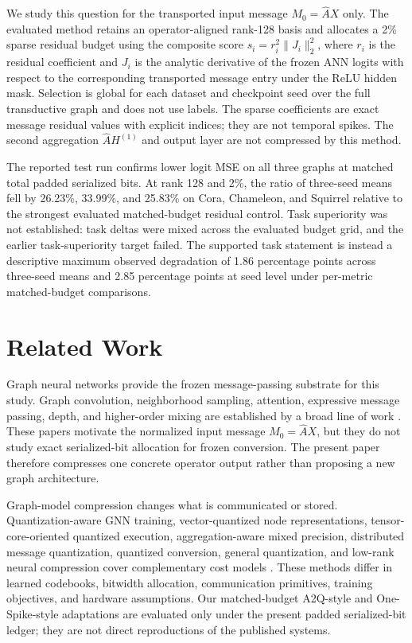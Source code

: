\documentclass{article}
\begin{document}
We study this question for the transported input message \(M_0=\hat{A}X\) only. The evaluated method retains an operator-aligned rank-128 basis and allocates a 2\% sparse residual budget using the composite score \(s_i=r_i^2\lVert J_i\rVert_2^2\), where \(r_i\) is the residual coefficient and \(J_i\) is the analytic derivative of the frozen ANN logits with respect to the corresponding transported message entry under the ReLU hidden mask. Selection is global for each dataset and checkpoint seed over the full transductive graph and does not use labels. The sparse coefficients are exact message residual values with explicit indices; they are not temporal spikes. The second aggregation \(\hat{A}H^{(1)}\) and output layer are not compressed by this method.

The reported test run confirms lower logit MSE on all three graphs at matched total padded serialized bits. At rank 128 and 2\%, the ratio of three-seed means fell by 26.23\%, 33.99\%, and 25.83\% on Cora, Chameleon, and Squirrel relative to the strongest evaluated matched-budget residual control. Task superiority was not established: task deltas were mixed across the evaluated budget grid, and the earlier task-superiority target failed. The supported task statement is instead a descriptive maximum observed degradation of 1.86 percentage points across three-seed means and 2.85 percentage points at seed level under per-metric matched-budget comparisons.

\section{Related Work}

\label{sec:related_work}

Graph neural networks provide the frozen message-passing substrate for this study. Graph convolution, neighborhood sampling, attention, expressive message passing, depth, and higher-order mixing are established by a broad line of work \cite{kipf2017gcn,hamilton2018graphsage,velickovic2018gat,xu2019gin,li2019deepgcn,abu2019mixhop,chen2020gcnii,li2018deeper,wu2021gnnsurvey}. These papers motivate the normalized input message \(M_0=\hat{A}X\), but they do not study exact serialized-bit allocation for frozen conversion. The present paper therefore compresses one concrete operator output rather than proposing a new graph architecture.

Graph-model compression changes what is communicated or stored. Quantization-aware GNN training, vector-quantized node representations, tensor-core-oriented quantized execution, aggregation-aware mixed precision, distributed message quantization, quantized conversion, general quantization, and low-rank neural compression cover complementary cost models \cite{tailor2021degreequant,ding2021vqgnn,wang2022qgtc,zhu2023a2q,wan2023adaqp,hu2023fast,gholami2022quantization,cherukuri2025lowrank}. These methods differ in learned codebooks, bitwidth allocation, communication primitives, training objectives, and hardware assumptions. Our matched-budget A2Q-style and One-Spike-style adaptations are evaluated only under the present padded serialized-bit ledger; they are not direct reproductions of the published systems.
\end{document}
